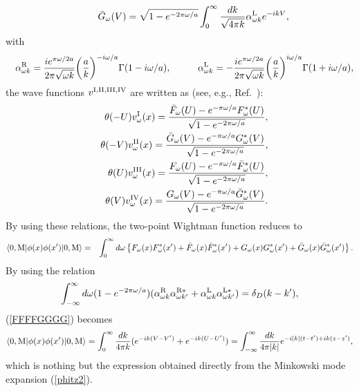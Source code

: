 \documentclass[aps,prd,preprintnumbers,nofootinbib,showpacs]{revtex4}%
\begin{document}
\begin{widetext}
\begin{eqnarray}
\hspace{10mm}
\bar G_\omega(V)=\sqrt{1-e^{-2\pi\omega/a}}\int_0^\infty {dk\over \sqrt{4\pi k}} \alpha_{\omega k}^{\rm L} e^{-ik V},
\nonumber
\end{eqnarray}
with
\begin{eqnarray}
&& \alpha_{\omega k}^{\rm R}={ie^{\pi\omega/2a}\over 2\pi\sqrt{\omega k}}\biggl({a\over k}\biggr)^{-i\omega/a}\Gamma(1-i\omega/a),
\hspace{10mm}
\alpha_{\omega k}^{\rm L}=-{ie^{\pi\omega/2a}\over 2\pi\sqrt{\omega k}}\biggl({a\over k}\biggr)^{i\omega/a}\Gamma(1+i\omega/a),
\nonumber
\end{eqnarray}
the wave functions $v^{\rm I, II, III, IV}$
 are written as (see, e.g.,  Ref.~\cite{Higuchi}):
\begin{eqnarray}
&&\theta(-U)v^{\rm I}_{\omega}(x)
=  \frac{\bar F_{\omega}(U) - e^{-\pi\omega/a} F_{\omega}^{*}(U)}{\sqrt{1 - e^{-2\pi\omega/a}}},
\label{eqfiveai2}
\\
&&\theta(-V)v^{\rm II}_{\omega}(x)
 =  \frac{\bar G_{\omega}(V) - e^{-\pi\omega/a}G_{\omega}^{*}(V)}{\sqrt{1-e^{-2\pi \omega/a}}},
\label{eqsixai2}
\\
&&\theta(U)v^{\rm III}_{\omega}(x)
=  \frac{F_{\omega}(U) - e^{-\pi\omega/a}\bar F_{\omega}^{*}(U)}{\sqrt{1 - e^{-2\pi\omega/a}}},
\label{eqsevenai2}
\\
&&\theta(V)v^{\rm IV}_{\omega}(x)
 =  \frac{G_{\omega}(V) - e^{-\pi\omega/a}\bar G_{\omega}^{*}(V)}{\sqrt{1-e^{-2\pi \omega/a}}} .
\label{eqnineai2}
\end{eqnarray}
By using these relations, the two-point Wightman function reduces to
\begin{eqnarray}
\langle0,{\rm M}|\phi(x)\phi(x')|0,{\rm M}\rangle
&=&\int_0^{\infty}d\omega\left\{ F_{\omega}(x)F^*_{\omega}(x')+\bar F_{\omega}(x)\bar F^*_{\omega}(x')
    +G_{\omega}(x)G^*_{\omega}(x')+\bar G_{\omega}(x)\bar G^*_{\omega}(x')
    \right\}.
    \label{FFFFGGGG}
\end{eqnarray}
By using the relation
\begin{eqnarray}
  \int_{-\infty}^\infty d\omega(1-e^{-2\pi\omega/a})(\alpha_{\omega k}^{\rm R}\alpha_{\omega k'}^{\rm R*}+
  \alpha_{\omega k}^{\rm L}\alpha_{\omega k'}^{\rm L*} )=\delta_D(k-k'), 
\end{eqnarray}
(\ref{FFFFGGGG}) becomes 
\begin{eqnarray}
  \langle0,{\rm M}|\phi(x)\phi(x')|0,{\rm M}\rangle
  =\int_0^\infty {dk\over 4\pi k}(e^{-ik(V-V')}+e^{-ik(U-U')})=
  \int_{-\infty}^\infty {dk\over 4\pi |k|}e^{-i|k|(t-t')+ik(z-z')} ,
\end{eqnarray}
which is nothing but the expression obtained directly from the Minkowski mode expansion (\ref{phitz2}).




\end{widetext}
\end{document}
